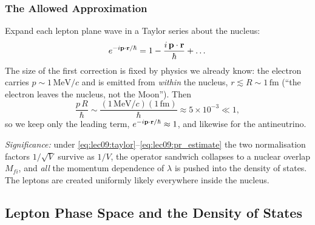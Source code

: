 \subsubsection*{The Allowed Approximation}
Expand each lepton plane wave in a Taylor series about the nucleus:
\begin{equation}
  \label{eq:lec09:taylor}
  e^{-i\mathbf{p}\cdot\mathbf{r}/\hbar}
  = 1 - \frac{i\,\mathbf{p}\cdot\mathbf{r}}{\hbar} + \dots
\end{equation}
The size of the first correction is fixed by physics we already know: the
electron carries $p\sim 1\,\text{MeV}/c$ and is emitted from \emph{within} the
nucleus, $r\lesssim R\sim 1\,\text{fm}$ (``the electron leaves the nucleus, not
the Moon''). Then
\begin{equation}
  \label{eq:lec09:pr_estimate}
  \frac{p\,R}{\hbar} \sim
  \frac{(1\,\text{MeV}/c)(1\,\text{fm})}{\hbar}
  \approx 5\times10^{-3} \ll 1,
\end{equation}
so we keep only the leading term, $e^{-i\mathbf{p}\cdot\mathbf{r}/\hbar}\approx 1$, and
likewise for the antineutrino.

\textit{Significance:} under \eqref{eq:lec09:taylor}--\eqref{eq:lec09:pr_estimate}
the two normalisation factors $1/\sqrt V$ survive as $1/V$, the operator
sandwich collapses to a nuclear overlap $M_{fi}$, and \emph{all} the momentum
dependence of $\lambda$ is pushed into the density of states. The leptons are
created uniformly likely everywhere inside the nucleus.

\subsection{Lepton Phase Space and the Density of States}
\label{subsec:lec09:phasespace}


